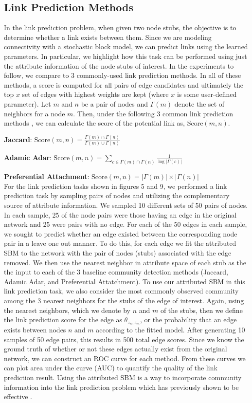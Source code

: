 \subsection{Link Prediction Methods}
In the link prediction problem, when given two node stubs, the objective is to determine whether a link exists between them. Since we are modeling connectivity with a stochastic block model, we can predict links using the learned parameters.  In particular, we highlight how this task can be performed using just the attribute information of the node stubs of interest. In the experiments to follow, we compare to 3 commonly-used link prediction methods. In all of these methods, a score is computed for all pairs of edge candidates and ultimately the top $x$ set of edges with highest weights are kept (where $x$ is some user-defined parameter). Let $m$ and $n$ be a pair of nodes and $\Gamma(m)$ denote the set of neighbors for a node $m$. Then, under the following 3 common  link prediction methods \cite{linkPredReview}, we can calculate the score of the potential link as, $\text{Score}(m,n)$.

{\bf Jaccard}: $\text{Score}(m,n)= \frac{\Gamma(m) \cap \Gamma(n)}{\Gamma(m)\cup \Gamma(n)}$

{\bf Adamic Adar}: $\text{Score}(m,n)=\sum_{c \in \Gamma(m) \cap \Gamma(n)}\frac{1}{\log |\Gamma(c)|}$

{\bf Preferential Attachment}: $\text{Score}(m,n)=|\Gamma(m)|\times |\Gamma(n)|$\\

For the link prediction tasks shown in figures 5 and 9, we performed a link prediction task by sampling pairs of nodes and utilizing the complementary source of attribute information. We sampled 10 different sets of 50 pairs of nodes. In each sample, 25 of the node pairs were those having an edge in the original network and 25 were pairs with no edge. For each of the 50 edges in each sample, we sought to predict whether an edge existed between the corresponding node pair in a leave one out manner. To do this, for each edge we fit the attributed SBM to the network with the pair of nodes (stubs) associated with the edge removed. We then use the nearest neighbor in attribute space of each stub as the the input to each of the 3 baseline community detection methods (Jaccard, Adamic Adar, and Preferential Attatchment). To use our attributed SBM in this link prediction task, we also consider the most commonly observed community among the 3 nearest neighbors for the stubs of the edge of interest. Again, using the nearest neighbors, which we denote by $n$ and $m$ of the stubs, then we define the link prediction score for the edge as $\theta_{z_{n},z_{m}}$, or the probability that an edge exists between nodes $n$ and $m$ according to the fitted model. After generating 10 samples of 50 edge pairs, this results in 500 total edge scores. Since we know the ground truth of whether or not these edges actually exist from the original network, we can construct an ROC curve for each method. From these curves we can plot area under the curve (AUC) to quantify the quality of the link prediction result. Using the attributed SBM is a way to incorporate community information into the link prediction problem which has previously shown to be effective \cite{linkComm}.

